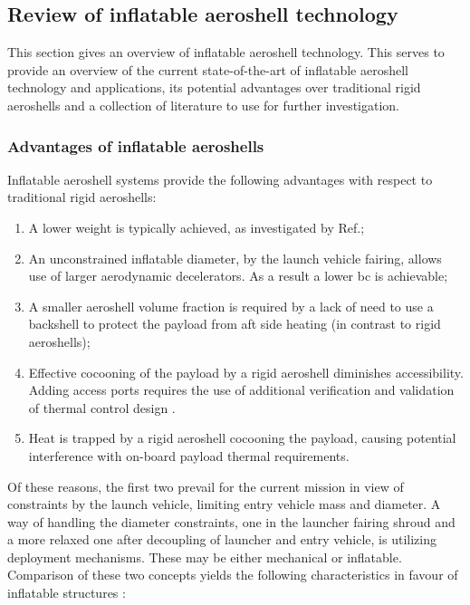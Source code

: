 \subsection{Review of inflatable aeroshell technology}\label{sec:aeroshells}
This section gives an overview of inflatable aeroshell technology. This serves to provide an overview of the current state-of-the-art of inflatable aeroshell technology and applications, its potential advantages over traditional rigid aeroshells and a collection of literature to use for further investigation.

\subsubsection{Advantages of inflatable aeroshells}
Inflatable aeroshell systems provide the following advantages with respect to traditional rigid aeroshells: \cite{Cassapakis1995, IRVEoverview} 
\begin{enumerate}
\item A lower weight is typically achieved, as investigated by Ref.\cite{Cianciolo2010};
\item An unconstrained inflatable diameter, by the launch vehicle fairing, allows use of larger aerodynamic decelerators. As a result a lower \gls{bc} is achievable;
\item A smaller aeroshell volume fraction is required by a lack of need to use a backshell to protect the payload from aft side heating (in contrast to rigid aeroshells);
\item Effective cocooning of the payload by a rigid aeroshell diminishes accessibility. Adding access ports requires the use of additional verification and validation of thermal control design \cite{Johnson}.
\item Heat is trapped by a rigid aeroshell cocooning the payload, causing potential interference with on-board payload thermal requirements.
\end{enumerate}
Of these reasons, the first two prevail for the current mission in view of constraints by the launch vehicle, limiting entry vehicle mass and diameter. A way of handling the diameter constraints, one in the launcher fairing shroud and a more relaxed one after decoupling of launcher and entry vehicle, is utilizing deployment mechanisms. These may be either mechanical or inflatable. Comparison of these two concepts yields the following characteristics in favour of inflatable structures \cite{Cassapakis1995}:
